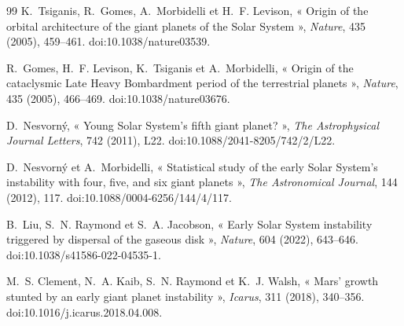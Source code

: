 \documentclass[11pt,a4paper,openany]{report}
\begin{document}
\begin{thebibliography}{99}
 K.~Tsiganis, R.~Gomes, A.~Morbidelli et H.~F. Levison, « Origin of the
orbital architecture of the giant planets of the Solar System », \emph{Nature}, 435 (2005),
459--461. doi:10.1038/nature03539.

 R.~Gomes, H.~F. Levison, K.~Tsiganis et A.~Morbidelli, « Origin of the
cataclysmic Late Heavy Bombardment period of the terrestrial planets », \emph{Nature}, 435
(2005), 466--469. doi:10.1038/nature03676.

 D.~Nesvorn\'y, « Young Solar System's fifth giant planet? »,
\emph{The Astrophysical Journal Letters}, 742 (2011), L22. doi:10.1088/2041-8205/742/2/L22.

 D.~Nesvorn\'y et A.~Morbidelli, « Statistical study of the early
Solar System's instability with four, five, and six giant planets », \emph{The Astronomical
Journal}, 144 (2012), 117. doi:10.1088/0004-6256/144/4/117.

 B.~Liu, S.~N. Raymond et S.~A. Jacobson, « Early Solar System instability
triggered by dispersal of the gaseous disk », \emph{Nature}, 604 (2022), 643--646.
doi:10.1038/s41586-022-04535-1.

 M.~S. Clement, N.~A. Kaib, S.~N. Raymond et K.~J. Walsh, « Mars' growth
stunted by an early giant planet instability », \emph{Icarus}, 311 (2018), 340--356.
doi:10.1016/j.icarus.2018.04.008.

\end{thebibliography}
\end{document}
